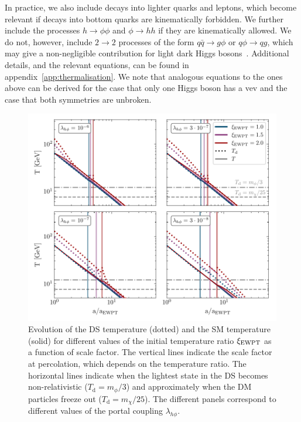 In practice, we also include decays into lighter quarks and leptons, which become relevant if decays into bottom quarks are kinematically forbidden. We further  include the processes $h \to \phi \phi$ and $\phi \to h h$ if they are kinematically allowed. We do not, however, include $2 \to 2$ processes of the form $q \bar{q} \to g \phi$ or $q \phi \to q g$, which may give a non-negligible contribution for light dark Higgs bosons~\cite{Evans:2017kti,Fradette:2018hhl}. Additional details, and the relevant equations, can be found in appendix~\ref{app:thermalisation}. We note that analogous equations to the ones above can be derived for the case that only one Higgs boson has a \ac{vev} and the case that both symmetries are unbroken.

\begin{figure}[t]
	\centering
	\includegraphics[width=\textwidth]{thesisplots/lisa/thesis_LISA_9}
	\caption{Evolution of the \ac{DS} temperature (dotted) and the \ac{SM} temperature (solid) for different values of the initial temperature ratio $\xi_{\text{EWPT}}$ as a function of scale factor. The vertical lines indicate the scale factor at percolation, which depends on the temperature ratio. The horizontal lines indicate when the lightest state in the \ac{DS} becomes non-relativistic ($T_\text{d} = m_\phi / 3$) and approximately when the \ac{DM} particles freeze out ($T_\text{d} = m_\chi / 25$). The different panels correspond to different values of the portal coupling $\lambda_{h\phi}$.}
	\label{fig:evolution}
\end{figure}

